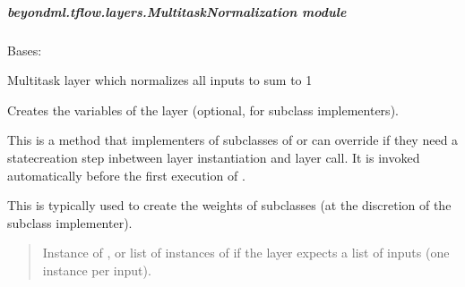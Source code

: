 \documentclass[letterpaper,10pt,english]{sphinxmanual}
\begin{document}
\subparagraph{beyondml.tflow.layers.MultitaskNormalization module}
\label{\detokenize{beyondml.tflow.layers:module-beyondml.tflow.layers.MultitaskNormalization}}\label{\detokenize{beyondml.tflow.layers:beyondml-tflow-layers-multitasknormalization-module}}

\begin{fulllineitems}
\label{\detokenize{beyondml.tflow.layers:beyondml.tflow.layers.MultitaskNormalization.MultitaskNormalization}}
\pysigstartsignatures
{}
\pysigstopsignatures
\sphinxAtStartPar
Bases: 

\sphinxAtStartPar
Multitask layer which normalizes all inputs to sum to 1

\begin{fulllineitems}
\label{\detokenize{beyondml.tflow.layers:beyondml.tflow.layers.MultitaskNormalization.MultitaskNormalization.build}}
\pysigstartsignatures
{}
\pysigstopsignatures
\sphinxAtStartPar
Creates the variables of the layer (optional, for subclass implementers).

\sphinxAtStartPar
This is a method that implementers of subclasses of  or 
can override if they need a state\sphinxhyphen{}creation step in\sphinxhyphen{}between
layer instantiation and layer call. It is invoked automatically before
the first execution of .

\sphinxAtStartPar
This is typically used to create the weights of  subclasses
(at the discretion of the subclass implementer).
\begin{quote}\begin{description}
\sphinxAtStartPar
{} \textendash{} Instance of , or list of instances of
 if the layer expects a list of inputs
(one instance per input).


\end{description}
\end{quote}
\end{fulllineitems}
\end{fulllineitems}
\end{document}
